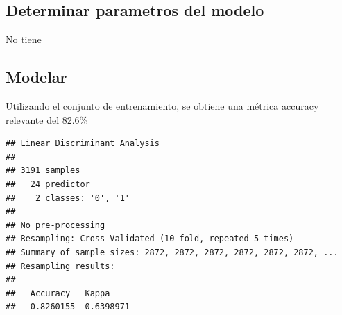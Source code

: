 \documentclass[]{article}
\begin{document}
\hypertarget{determinar-parametros-del-modelo-1}{%
\subsection{Determinar parametros del
modelo}\label{determinar-parametros-del-modelo-1}}

No tiene

\hypertarget{modelar-3}{%
\subsection{Modelar}\label{modelar-3}}

Utilizando el conjunto de entrenamiento, se obtiene una métrica accuracy
relevante del 82.6\%

\begin{lstlisting}
## Linear Discriminant Analysis 
## 
## 3191 samples
##   24 predictor
##    2 classes: '0', '1' 
## 
## No pre-processing
## Resampling: Cross-Validated (10 fold, repeated 5 times) 
## Summary of sample sizes: 2872, 2872, 2872, 2872, 2872, 2872, ... 
## Resampling results:
## 
##   Accuracy   Kappa    
##   0.8260155  0.6398971
\end{lstlisting}
\end{document}
